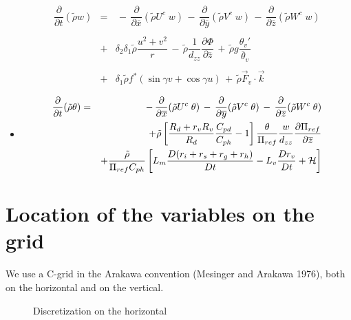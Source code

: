 \begin{itemize}
\begin{eqnarray}
& & \nonumber \\
\dfrac{\partial}{\partial t}(\tilde{\rho} w) &= &
 \, - \, \dfrac{\partial }{\partial \overline{x}} (\tilde{\rho} U^{c} \;  w)
 \, - \, \dfrac{\partial }{\partial \overline{y}} (\tilde{\rho} V^{c} \;  w )
 \, - \, \dfrac{\partial }{\partial \overline{z}} (\tilde{\rho} W^{c} \;  w)
\nonumber \\ & & \nonumber \\
 & + & \delta _{2}\delta _{1}\tilde{\rho}\dfrac{ u ^{2}+ v ^{2} }{r}
 \,  - \, \tilde{\rho}\dfrac{1}{d_{zz}}
\dfrac{\partial \Phi}{\partial \overline{z}}
 \, + \,\tilde{\rho} g \dfrac{\theta_v ' }{\overline{\theta}_v}\nonumber \\
& & \nonumber \\
&  + &\delta _{1}\tilde{\rho} f^* (\sin\gamma  v  + \cos\gamma  u )
 \, + \, \tilde{\rho} \vec{F}_{v} \cdot \vec{k}
 \end{eqnarray}

\item{}

\begin{eqnarray}
\dfrac{\partial}{\partial t}(\tilde{\rho}\theta) &=& \, - \,
 \dfrac{\partial }{\partial \overline{x}} (\tilde{\rho} U^{c} \;  \theta)
 \, - \, \dfrac{\partial }{\partial \overline{y}} (\tilde{\rho} V^{c} \;  \theta )
\, - \, \dfrac{\partial }{\partial \overline{z}} (\tilde{\rho} W^{c} \;  \theta)
\nonumber \\ & &
+\tilde{\rho} \left[ {R_d+r_vR_v\over R_d}{C_{pd} \over C_{ph}}-1 \right]
{\theta \over \Pi_{ref}} {w \over d_{zz} }
 {\partial \Pi_{ref} \over \partial \overline{z}}
\nonumber \\ & &
+ {\tilde{\rho}\over \Pi_{ref} C_{ph}} \left[
 L_m {D(r_i+r_s+r_g+r_h)\over Dt} - L_v {Dr_v\over Dt} + {\cal H}  \right]
\end{eqnarray}
\end{itemize}


\section{Location of the variables on the grid}

We use a C-grid in the Arakawa convention (Mesinger and Arakawa 1976),
both on the horizontal and on the vertical.

\begin{figure}[pbh]
\vspace{1cm}
\caption{Discretization on the horizontal \label{horizgrid}}
\end{figure}


